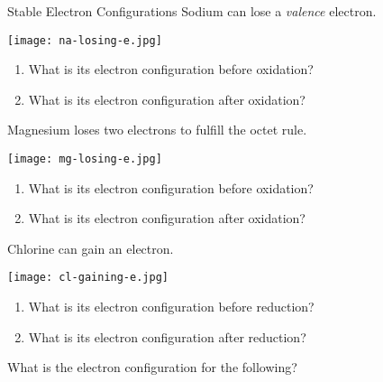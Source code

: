 \documentclass[notes=show]{beamer}
\begin{document}
\begin{frame}[allowframebreaks]{Stable Electron Configurations}
	Sodium can \alert{lose} a \emph{valence} electron.

	\begin{center}
		\texttt{[image: na-losing-e.jpg]}
	\end{center}

	\begin{enumerate}
		\item What is its electron configuration \alert{before}
			oxidation?

			\bigskip

		\item What is its electron configuration \alert{after} oxidation?
	\end{enumerate}
	
	\framebreak

	Magnesium loses two electrons to fulfill the octet rule.

	\begin{center}
		\texttt{[image: mg-losing-e.jpg]}
	\end{center}

	\begin{enumerate}
		\item What is its electron configuration \alert{before}
			oxidation?

			\bigskip

		\item What is its electron configuration \alert{after} oxidation?
	\end{enumerate}
	
	\framebreak
	
	Chlorine can \alert{gain} an electron.

	\begin{center}
		\texttt{[image: cl-gaining-e.jpg]}
	\end{center}

	\begin{enumerate}
		\item What is its electron configuration \alert{before}
			reduction?

			\bigskip

		\item What is its electron configuration \alert{after} reduction?
	\end{enumerate}

	\framebreak

	What is the electron configuration for the following?


\end{frame}
\end{document}
